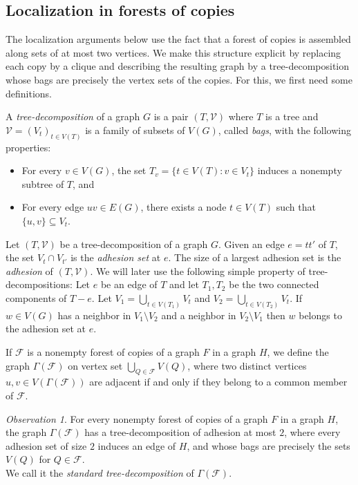 \documentclass[11pt]{article}
\theoremstyle{remark}
\newtheorem{observation}[theorem]{Observation}
\begin{document}
\subsection{Localization in forests of copies}

The localization arguments below use the fact that a forest of copies is assembled along sets of at most two vertices.
We make this structure explicit by replacing each copy by a clique and describing the resulting graph by a tree-decomposition whose bags are precisely the vertex sets of the copies.
For this, we first need some definitions.

A \emph{tree-decomposition} of a graph $G$ is a pair $(T, \mathcal{V})$ where $T$ is a tree and $\mathcal{V} = (V_t)_{t \in V(T)}$ is a family of subsets of $V(G)$, called \emph{bags}, with the following properties: \begin{itemize}
    \item For every $v \in V(G)$, the set $T_v = \{t \in V(T) : v \in V_t\}$ induces a nonempty subtree of $T$, and
    \item For every edge $uv \in E(G)$, there exists a node $t \in V(T)$ such that $\{u, v\} \subseteq V_t$.
\end{itemize}

Let $(T, \mathcal{V})$ be a tree-decomposition of a graph $G$.
Given an edge $e = tt'$ of $T$, the set $V_t \cap V_{t'}$ is the \emph{adhesion set} at $e$.
The size of a largest adhesion set is the \emph{adhesion} of $(T, \mathcal{V})$.
We will later use the following simple property of tree-decompositions: Let $e$ be an edge of $T$ and let $T_1, T_2$ be the two connected components of $T-e$. Let $V_1 = \bigcup_{t \in V(T_1)}V_t$ and $V_2 = \bigcup_{t \in V(T_2)}V_t$. If $w \in V(G)$ has a neighbor in $V_1 \setminus V_2$ and a neighbor in $V_2 \setminus V_1$ then $w$ belongs to the adhesion set at $e$. 

\medskip

If $\mathcal{F}$ is a nonempty forest of copies of a graph $F$ in a graph $H$, we define the graph $\Gamma(\mathcal{F})$ on vertex set $\bigcup_{Q \in \mathcal{F}}V(Q)$, where two distinct vertices $u, v \in V(\Gamma(\mathcal{F}))$ are adjacent if and only if they belong to a common member of $\mathcal{F}$.

\begin{observation}
    For every nonempty forest of copies of a graph $F$ in a graph $H$, the graph $\Gamma(\mathcal{F})$ has a tree-decomposition of adhesion at most $2$, where every adhesion set of size $2$ induces an edge of $H$, and whose bags are precisely the sets $V(Q)$ for $Q\in\mathcal F$. \\
    We call it the \emph{standard tree-decomposition} of $\Gamma(\mathcal{F})$.
\end{observation}
\end{document}
